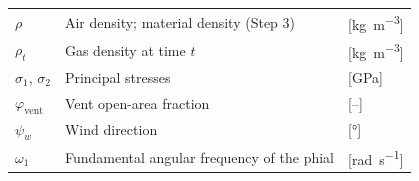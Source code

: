 {\begin{longtable}{L{0.16} L{0.64} L{0.20}}
$\rho$ & Air density; material density (Step 3) & [\si{\kilogram\per\metre\cubed}] \\
$\rho_t$ & Gas density at time $t$ & [\si{\kilogram\per\metre\cubed}] \\
$\sigma_1$, $\sigma_2$ & Principal stresses & [GPa] \\
$\varphi_\text{vent}$ & Vent open-area fraction & [--] \\
$\psi_w$ & Wind direction & [\si{\degree}] \\
$\omega_1$ & Fundamental angular frequency of the phial & [\si{\radian\per\second}] \\
\end{longtable}
}
